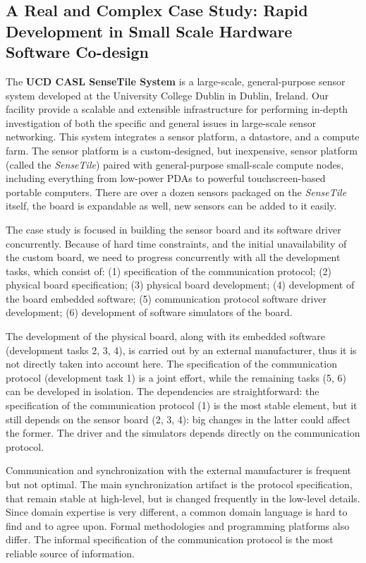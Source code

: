 \documentclass[english]{lni}
\newcommand{\ST}{\emph{SenseTile}\xspace}
\begin{document}
\subsection{A Real and Complex Case Study: Rapid Development in Small Scale Hardware Software Co-design}
\label{subsec:a_real_and_complex_case_study}

The \textbf{UCD CASL SenseTile System} is a large-scale, general-purpose sensor system developed at the University College Dublin in Dublin, Ireland.
Our facility provide a scalable and extensible infrastructure for performing in-depth investigation of both the specific and general issues in large-scale sensor networking.
This system integrates a sensor platform, a datastore, and a compute farm.  
The sensor platform is a custom-designed, but inexpensive, sensor platform (called the \ST) paired with general-purpose small-scale compute nodes, including everything from low-power PDAs to powerful touchscreen-based portable computers.  
There are over a dozen sensors packaged on the \ST itself, the board is expandable as well, new sensors can be added to it easily.

The case study is focused in building the sensor board and its software driver concurrently.
Because of hard time constraints, and the initial unavailability of the custom board, we need to progress concurrently with all the development tasks, which consist of: (1) specification of the communication protocol; (2) physical board specification; (3) physical board development; (4) development of the board embedded software; (5) communication protocol software driver development; (6) development of software simulators of the board.

The development of the physical board, along with its embedded software (development tasks 2, 3, 4), is carried out by an external manufacturer, thus it is not directly taken into account here. 
The specification of the communication protocol (development task 1) is a joint effort, while the remaining tasks (5, 6) can be developed in isolation.
The dependencies are straightforward: the specification of the communication protocol (1) is the most stable element, but it still depends on the sensor board (2, 3, 4): big changes in the latter could affect the former.
The driver and the simulators depends directly on the communication protocol.

Communication and synchronization with the external manufacturer is frequent but not optimal.
The main synchronization artifact is the protocol specification, that remain stable at high-level, but is changed frequently in the low-level details.
Since domain expertise is very different, a common domain language is hard to find and to agree upon.
Formal methodologies and programming platforms also differ.
The informal specification of the communication protocol is the most reliable source of information.
\end{document}
